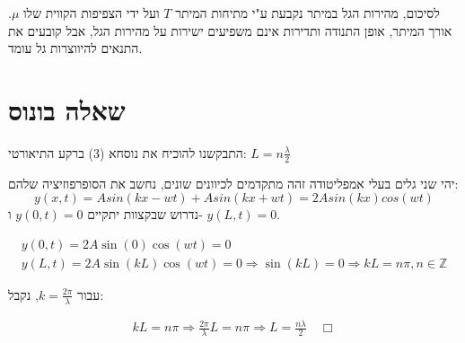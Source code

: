 \documentclass[14pt]{extarticle}
\begin{document}
לסיכום, מהירות הגל במיתר נקבעת ע"י מתיחות המיתר $T$ ועל ידי הצפיפות הקווית שלו $\mu$. אורך המיתר, אופן התנודה ותדירות אינם משפיעים ישירות על מהירות הגל, אבל קובעים את התנאים להיווצרות גל עומד.

\section*{שאלה בונוס}
התבקשנו להוכיח את נוסחא (3) ברקע התיאורטי: $L=n\frac{\lambda}{2}$

יהי שני גלים בעלי  אמפליטודה זהה מתקדמים לכיוונים   שונים, נחשב את הסופרפוזיציה שלהם:
\begin{equation*}
    y(x,t) = Asin(kx-wt) + Asin(kx+wt) = 2Asin(kx)cos(wt)
\end{equation*}
נדרוש שבקצוות יתקיים $y(0,t)=0$ ו- $y(L,t)=0$.
\begin{center}
    \begin{equation*}
        \begin{aligned}
            y(0,t) = 2A\sin(0)\cos(wt) = 0 \\
            y(L,t) = 2A\sin(kL)\cos(wt) = 0 \Rightarrow \sin(kL) = 0 \Rightarrow kL = n\pi, n \in \mathbb{Z}
        \end{aligned}
    \end{equation*}
\end{center}
עבור $k=\frac{2\pi}{\lambda}$, נקבל:

\begin{center}
    \begin{equation*}
        \begin{aligned}
            kL = n\pi \Rightarrow \frac{2\pi}{\lambda}L = n\pi \Rightarrow L = \frac{n\lambda}{2} \quad \Box
        \end{aligned}
    \end{equation*}
\end{center}
\end{document}
